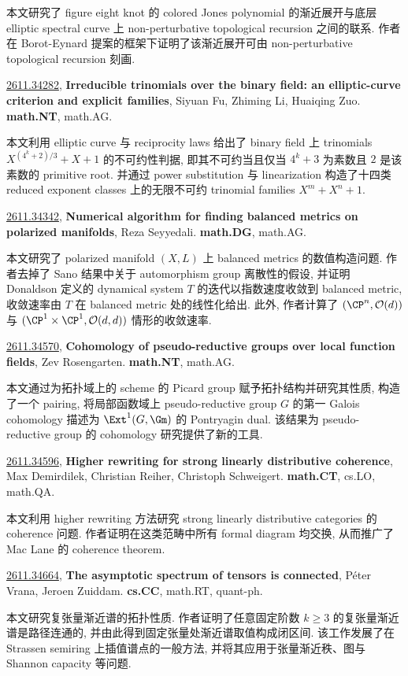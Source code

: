 \documentclass[9pt, a4paper]{article}
\theoremstyle{plain}
\theoremstyle{definition}
\theoremstyle{remark}
\newcommand{\arxivwithtarget}[3]{\hypertarget{#1}{}\href{https://arxiv.org/abs/#1}{#1}, \textbf{\textcolor{arxivblue}{#2}}, #3. }
\begin{document}
本文研究了 figure eight knot 的 colored Jones polynomial 的渐近展开与底层 elliptic spectral curve 上 non-perturbative topological recursion 之间的联系. 作者在 Borot-Eynard 提案的框架下证明了该渐近展开可由 non-perturbative topological recursion 刻画.


\arxivwithtarget{2611.34282}{Irreducible trinomials over the binary field: an elliptic-curve criterion and explicit families}{Siyuan Fu, Zhiming Li, Huaiqing Zuo}\textbf{math.NT}, math.AG.

本文利用 elliptic curve 与 reciprocity laws 给出了 binary field 上 trinomials $X^{(4^k+2)/3}+X+1$ 的不可约性判据, 即其不可约当且仅当 $4^k+3$ 为素数且 $2$ 是该素数的 primitive root. 并通过 power substitution 与 linearization 构造了十四类 reduced exponent classes 上的无限不可约 trinomial families $X^m+X^n+1$.


\arxivwithtarget{2611.34342}{Numerical algorithm for finding balanced metrics on polarized manifolds}{Reza Seyyedali}\textbf{math.DG}, math.AG.

本文研究了 polarized manifold $(X,L)$ 上 balanced metrics 的数值构造问题. 作者去掉了 Sano 结果中关于 automorphism group 离散性的假设, 并证明 Donaldson 定义的 dynamical system $T$ 的迭代以指数速度收敛到 balanced metric, 收敛速率由 $T$ 在 balanced metric 处的线性化给出. 此外, 作者计算了 $(\CP^n,\mathcal{O}(d))$ 与 $(\CP^1\times\CP^1,\mathcal{O}(d,d))$ 情形的收敛速率.


\arxivwithtarget{2611.34570}{Cohomology of pseudo-reductive groups over local function fields}{Zev Rosengarten}\textbf{math.NT}, math.AG.

本文通过为拓扑域上的 scheme 的 Picard group 赋予拓扑结构并研究其性质, 构造了一个 pairing, 将局部函数域上 pseudo-reductive group $G$ 的第一 Galois cohomology 描述为 $\Ext^1(G, \Gm)$ 的 Pontryagin dual. 该结果为 pseudo-reductive group 的 cohomology 研究提供了新的工具.


\arxivwithtarget{2611.34596}{Higher rewriting for strong linearly distributive coherence}{Max Demirdilek, Christian Reiher, Christoph Schweigert}\textbf{math.CT}, cs.LO, math.QA.

本文利用 higher rewriting 方法研究 strong linearly distributive categories 的 coherence 问题. 作者证明在这类范畴中所有 formal diagram 均交换, 从而推广了 Mac Lane 的 coherence theorem.


\arxivwithtarget{2611.34664}{The asymptotic spectrum of tensors is connected}{Péter Vrana, Jeroen Zuiddam}\textbf{cs.CC}, math.RT, quant-ph.

本文研究复张量渐近谱的拓扑性质. 作者证明了任意固定阶数 \(k \geq 3\) 的复张量渐近谱是路径连通的, 并由此得到固定张量处渐近谱取值构成闭区间. 该工作发展了在 Strassen semiring 上插值谱点的一般方法, 并将其应用于张量渐近秩、图与 Shannon capacity 等问题.
\end{document}
